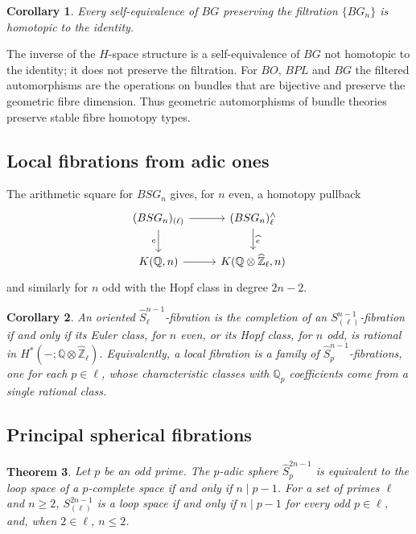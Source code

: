 \documentclass[11pt]{amsart}
\theoremstyle{plain}
\newtheorem{theorem}{Theorem}[section]
\newtheorem{corollary}[theorem]{Corollary}
\theoremstyle{definition}
\numberwithin{equation}{section}
\newcommand{\Q}{\mathbb{Q}}
\newcommand{\Zhat}{\widehat{\mathbb{Z}}}
\begin{document}
\begin{corollary}
Every self-equivalence of $BG$ preserving the filtration $\{BG_n\}$ is homotopic to the identity.
\end{corollary}

The inverse of the $H$-space structure is a self-equivalence of $BG$ not homotopic to the identity; it does not preserve the filtration.
For $BO$, $BPL$ and $BG$ the filtered automorphisms are the operations on bundles that are bijective and preserve the geometric fibre dimension.
Thus geometric automorphisms of bundle theories preserve stable fibre homotopy types.

\subsection{Local fibrations from adic ones}
The arithmetic square for $BSG_n$ gives, for $n$ even, a homotopy pullback
\[
\begin{tikzcd}
(BSG_n)_{(\ell)}\arrow[r]\arrow[d,"e"'] & (BSG_n)^\wedge_\ell\arrow[d,"\widehat e"]\\
K(\Q,n)\arrow[r] & K(\Q\otimes\Zhat_\ell,n)
\end{tikzcd}
\]
and similarly for $n$ odd with the Hopf class in degree $2n-2$.

\begin{corollary}\label{cor:rationality}
An oriented $\widehat S^{n-1}_\ell$-fibration is the completion of an $S^{n-1}_{(\ell)}$-fibration if and only if its Euler class, for $n$ even, or its Hopf class, for $n$ odd, is rational in $H^*(-;\Q\otimes\Zhat_\ell)$.
Equivalently, a local fibration is a family of $\widehat S^{n-1}_p$-fibrations, one for each $p\in\ell$, whose characteristic classes with $\Q_p$ coefficients come from a single rational class.
\end{corollary}

\subsection{Principal spherical fibrations}

\begin{theorem}\label{thm:loopspheres}
Let $p$ be an odd prime.
The $p$-adic sphere $\widehat S^{2n-1}_p$ is equivalent to the loop space of a $p$-complete space if and only if $n\mid p-1$.
For a set of primes $\ell$ and $n\ge2$, $S^{2n-1}_{(\ell)}$ is a loop space if and only if $n\mid p-1$ for every odd $p\in\ell$, and, when $2\in\ell$, $n\le2$.
\end{theorem}
\end{document}
